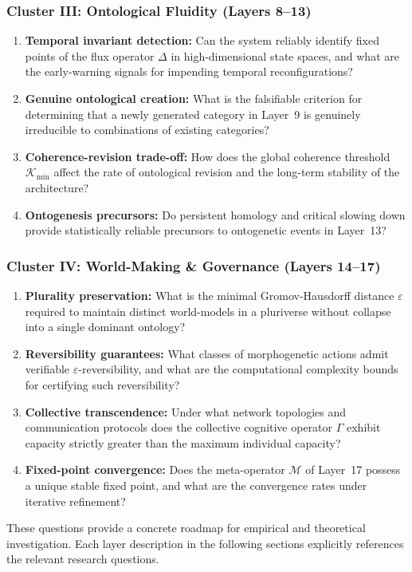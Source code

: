 \subsubsection{Cluster III: Ontological Fluidity (Layers 8--13)}
\begin{enumerate}[label=RQ\arabic*:, leftmargin=2.5cm, resume=rq]
    \item \textbf{Temporal invariant detection:} Can the system reliably identify fixed points of the flux operator $\Delta$ in high-dimensional state spaces, and what are the early-warning signals for impending temporal reconfigurations?
    \item \textbf{Genuine ontological creation:} What is the falsifiable criterion for determining that a newly generated category in Layer~9 is genuinely irreducible to combinations of existing categories?
    \item \textbf{Coherence-revision trade-off:} How does the global coherence threshold $\mathcal{K}_{\text{min}}$ affect the rate of ontological revision and the long-term stability of the architecture?
    \item \textbf{Ontogenesis precursors:} Do persistent homology and critical slowing down provide statistically reliable precursors to ontogenetic events in Layer~13?
\end{enumerate}

\subsubsection{Cluster IV: World-Making \& Governance (Layers 14--17)}
\begin{enumerate}[label=RQ\arabic*:, leftmargin=2.5cm, resume=rq]
    \item \textbf{Plurality preservation:} What is the minimal Gromov-Hausdorff distance $\varepsilon$ required to maintain distinct world-models in a pluriverse without collapse into a single dominant ontology?
    \item \textbf{Reversibility guarantees:} What classes of morphogenetic actions admit verifiable $\varepsilon$-reversibility, and what are the computational complexity bounds for certifying such reversibility?
    \item \textbf{Collective transcendence:} Under what network topologies and communication protocols does the collective cognitive operator $\Gamma$ exhibit capacity strictly greater than the maximum individual capacity?
    \item \textbf{Fixed-point convergence:} Does the meta-operator $\mathcal{M}$ of Layer~17 possess a unique stable fixed point, and what are the convergence rates under iterative refinement?
\end{enumerate}

These questions provide a concrete roadmap for empirical and theoretical investigation. Each layer description in the following sections explicitly references the relevant research questions.